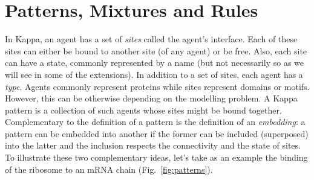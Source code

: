 \documentclass{article}
\newcommand{\kpp}{Kappa\xspace}
\begin{document}
\section{Patterns, Mixtures and Rules}
In \kpp, an agent has a set of \emph{sites} called the agent's
interface.  Each of these sites can either be bound to another site
(of any agent) or be free.  Also, each site can have a state, commonly
represented by a name (but not necessarily so as we will see in some
of the extensions).  In addition to a set of sites, each agent has a
\emph{type}.  Agents commonly represent proteins while sites represent
domains or motifs.  However, this can be otherwise depending on the
modelling problem.  A \kpp pattern is a collection of such agents
whose sites might be bound together.  Complementary to the definition
of a pattern is the definition of an \emph{embedding}: a pattern can
be embedded into another if the former can be included (superposed)
into the latter and the inclusion respects the connectivity and the
state of sites.  To illustrate these two complementary ideas, let's
take as an example the binding of the ribosome to an mRNA chain
(Fig.~\ref{fig:patterns}).
\end{document}

